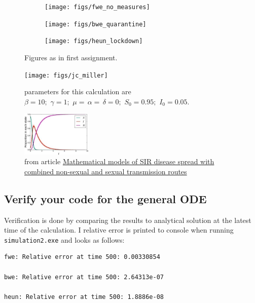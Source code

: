 \documentclass[a4paper]{article}
\newcommand{\answer}[1]{\vspace{-0.75em}\begin{framed} #1 \end{framed}\vspace{-0.75em}}
\begin{document}
\begin{figure}[!h]
	\centering
	\begin{subfigure}{0.32\linewidth}
		\centering
		\texttt{[image: figs/fwe\_no\_measures]}
	\end{subfigure}
	\begin{subfigure}{0.32\linewidth}
		\centering
		\texttt{[image: figs/bwe\_quarantine]}
	\end{subfigure}
	\begin{subfigure}{0.32\linewidth}
		\centering
		\texttt{[image: figs/heun\_lockdown]}
	\end{subfigure}
\caption{Figures as in first assignment.}

\end{figure}
\begin{figure}[!h]
	\centering
	\texttt{[image: figs/jc\_miller]}
	\caption{parameters for this calculation are
		$\label{eq:parameters2ndExample}
		\beta = 10;\,\,
		\gamma = 1;\,\,
		\mu=\,\alpha=\,\delta = 0;\,\,
		S_0 = 0.95;\,\,
		I_0 = 0.05.\,\,
		$}
\end{figure}
\begin{figure}[!h]
	\centering
	\includegraphics[width=0.3\textwidth]{figs/sirMiller.jpg}
	\caption{from article  \href{https://www.ncbi.nlm.nih.gov/pmc/articles/PMC5963332/}{Mathematical models of SIR disease spread with combined non-sexual and sexual transmission routes}}
\end{figure}
\subsection*{Verify your code for the general ODE}
	\answer{Verification is done by comparing the results to analytical solution at the latest time of the calculation. I relative error is printed to console when running \texttt{simulation2.exe} and looks as follows: }
\begin{lstlisting}
fwe: Relative error at time 500: 0.00330854

bwe: Relative error at time 500: 2.64313e-07

heun: Relative error at time 500: 1.8886e-08 
\end{lstlisting} 
\end{document}
